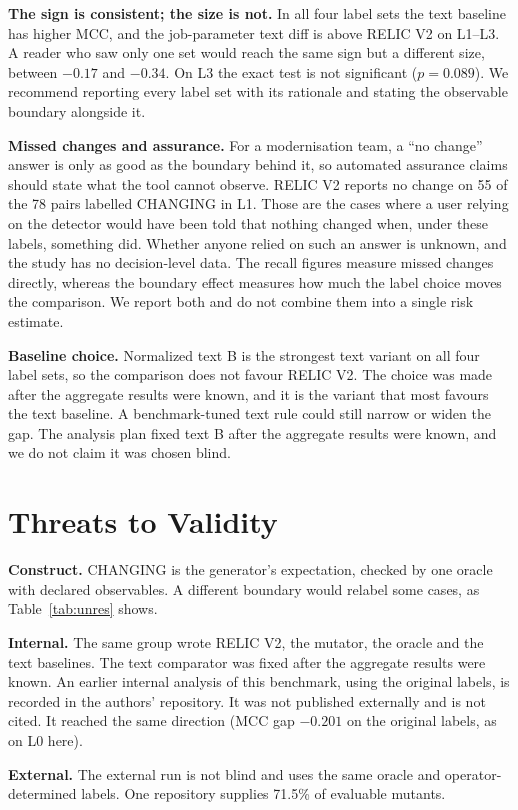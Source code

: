 \documentclass[conference]{IEEEtran}
\begin{document}
\textbf{The sign is consistent; the size is not.} In all four label sets the text baseline has higher MCC, and the job-parameter text diff is above RELIC V2 on L1--L3. A reader who saw only one set would reach the same sign but a different size, between $-0.17$ and $-0.34$. On L3 the exact test is not significant ($p=0.089$). We recommend reporting every label set with its rationale and stating the observable boundary alongside it.

\textbf{Missed changes and assurance.} For a modernisation team, a ``no change'' answer is only as good as the boundary behind it, so automated assurance claims should state what the tool cannot observe. RELIC V2 reports no change on 55 of the 78 pairs labelled CHANGING in L1. Those are the cases where a user relying on the detector would have been told that nothing changed when, under these labels, something did. Whether anyone relied on such an answer is unknown, and the study has no decision-level data. The recall figures measure missed changes directly, whereas the boundary effect measures how much the label choice moves the comparison. We report both and do not combine them into a single risk estimate.

\textbf{Baseline choice.} Normalized text B is the strongest text variant on all four label sets, so the comparison does not favour RELIC V2. The choice was made after the aggregate results were known, and it is the variant that most favours the text baseline. A benchmark-tuned text rule could still narrow or widen the gap. The analysis plan fixed text B after the aggregate results were known, and we do not claim it was chosen blind.

\section{Threats to Validity}
\textbf{Construct.} CHANGING is the generator's expectation, checked by one oracle with declared observables. A different boundary would relabel some cases, as Table~\ref{tab:unres} shows.

\textbf{Internal.} The same group wrote RELIC V2, the mutator, the oracle and the text baselines. The text comparator was fixed after the aggregate results were known. An earlier internal analysis of this benchmark, using the original labels, is recorded in the authors' repository. It was not published externally and is not cited. It reached the same direction (MCC gap $-0.201$ on the original labels, as on L0 here).

\textbf{External.} The external run is not blind and uses the same oracle and operator-determined labels. One repository supplies 71.5\% of evaluable mutants.
\end{document}

